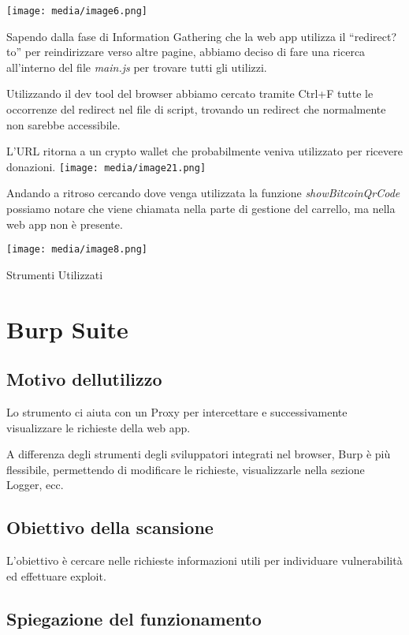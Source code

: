 \texttt{[image: media/image6.png]}

Sapendo dalla fase di Information Gathering che la web app utilizza il
``redirect?to'' per reindirizzare verso altre pagine, abbiamo deciso di
fare una ricerca all'interno del file \emph{main.js} per trovare tutti
gli utilizzi.

Utilizzando il dev tool del browser abbiamo cercato tramite Ctrl+F tutte
le occorrenze del redirect nel file di script, trovando un redirect che
normalmente non sarebbe accessibile.

L'URL ritorna a un crypto wallet che probabilmente veniva utilizzato per
ricevere donazioni.
\texttt{[image: media/image21.png]}

Andando a ritroso cercando dove venga utilizzata la funzione
\emph{showBitcoinQrCode} possiamo notare che viene chiamata nella parte
di gestione del carrello, ma nella web app non è presente.

\texttt{[image: media/image8.png]}

Strumenti Utilizzati

\section{Burp Suite}\label{burp-suite}

\subsection{Motivo
dell\textquotesingle utilizzo}\label{motivo-dellutilizzo}

Lo strumento ci aiuta con un Proxy per intercettare e successivamente
visualizzare le richieste della web app.

A differenza degli strumenti degli sviluppatori integrati nel browser,
Burp è più flessibile, permettendo di modificare le richieste,
visualizzarle nella sezione Logger, ecc.

\subsection{Obiettivo della scansione}\label{obiettivo-della-scansione}

L'obiettivo è cercare nelle richieste informazioni utili per individuare
vulnerabilità ed effettuare exploit.

\subsection{Spiegazione del
funzionamento}\label{spiegazione-del-funzionamento}

